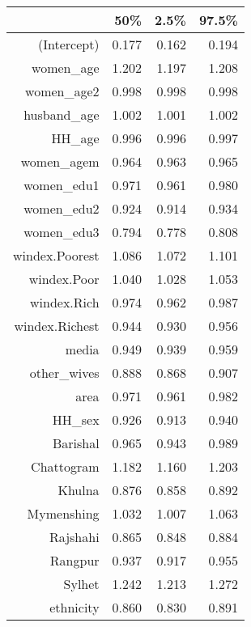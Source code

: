 \begin{table}[ht]
\centering
\begin{tabular}{rrrr}
  \hline
 & 50\% & 2.5\% & 97.5\% \\ 
  \hline
(Intercept) & 0.177 & 0.162 & 0.194 \\ 
  women\_age & 1.202 & 1.197 & 1.208 \\ 
  women\_age2 & 0.998 & 0.998 & 0.998 \\ 
  husband\_age & 1.002 & 1.001 & 1.002 \\ 
  HH\_age & 0.996 & 0.996 & 0.997 \\ 
  women\_agem & 0.964 & 0.963 & 0.965 \\ 
  women\_edu1 & 0.971 & 0.961 & 0.980 \\ 
  women\_edu2 & 0.924 & 0.914 & 0.934 \\ 
  women\_edu3 & 0.794 & 0.778 & 0.808 \\ 
  windex.Poorest & 1.086 & 1.072 & 1.101 \\ 
  windex.Poor & 1.040 & 1.028 & 1.053 \\ 
  windex.Rich & 0.974 & 0.962 & 0.987 \\ 
  windex.Richest & 0.944 & 0.930 & 0.956 \\ 
  media & 0.949 & 0.939 & 0.959 \\ 
  other\_wives & 0.888 & 0.868 & 0.907 \\ 
  area & 0.971 & 0.961 & 0.982 \\ 
  HH\_sex & 0.926 & 0.913 & 0.940 \\ 
  Barishal & 0.965 & 0.943 & 0.989 \\ 
  Chattogram & 1.182 & 1.160 & 1.203 \\ 
  Khulna & 0.876 & 0.858 & 0.892 \\ 
  Mymenshing & 1.032 & 1.007 & 1.063 \\ 
  Rajshahi & 0.865 & 0.848 & 0.884 \\ 
  Rangpur & 0.937 & 0.917 & 0.955 \\ 
  Sylhet & 1.242 & 1.213 & 1.272 \\ 
  ethnicity & 0.860 & 0.830 & 0.891 \\ 
   \hline
\end{tabular}
\end{table}

